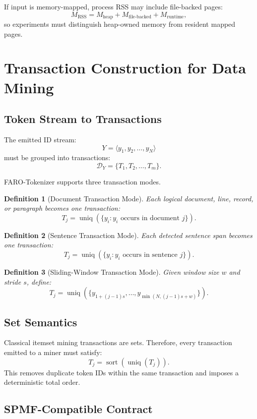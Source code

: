 \documentclass[11pt,a4paper]{article}
\newtheorem{definition}{Definition}
\newcommand{\D}{\mathcal{D}}
\newcommand{\uniq}{\operatorname{uniq}}
\newcommand{\sort}{\operatorname{sort}}
\newcommand{\RSS}{\operatorname{RSS}}
\begin{document}
If input is memory-mapped, process RSS may include file-backed pages:
\[
M_{\RSS}=M_{\text{heap}}+M_{\text{file-backed}}+M_{\text{runtime}},
\]
so experiments must distinguish heap-owned memory from resident mapped pages.

\section{Transaction Construction for Data Mining}

\subsection{Token Stream to Transactions}

The emitted ID stream:
\[
Y=\langle y_1,y_2,\dots,y_N\rangle
\]
must be grouped into transactions:
\[
\D_Y=\{T_1,T_2,\dots,T_m\}.
\]

FARO-Tokenizer supports three transaction modes.

\begin{definition}[Document Transaction Mode]
Each logical document, line, record, or paragraph becomes one transaction:
\[
T_j=\uniq(\{y_i : y_i \text{ occurs in document }j\}).
\]
\end{definition}

\begin{definition}[Sentence Transaction Mode]
Each detected sentence span becomes one transaction:
\[
T_j=\uniq(\{y_i : y_i \text{ occurs in sentence }j\}).
\]
\end{definition}

\begin{definition}[Sliding-Window Transaction Mode]
Given window size \(w\) and stride \(s\), define:
\[
T_j=
\uniq\left(
\{y_{1+(j-1)s},\dots,y_{\min(N,(j-1)s+w)}\}
\right).
\]
\end{definition}

\subsection{Set Semantics}

Classical itemset mining transactions are sets. Therefore, every transaction emitted to a miner must satisfy:
\[
T_j=\sort(\uniq(T_j)).
\]
This removes duplicate token IDs within the same transaction and imposes a deterministic total order.

\subsection{SPMF-Compatible Contract}
\end{document}

